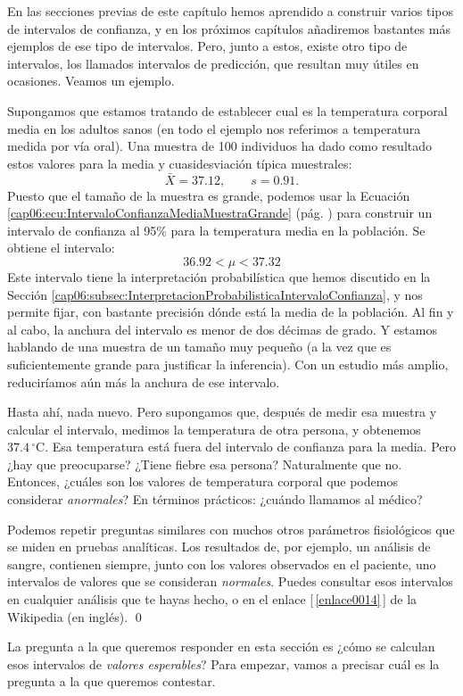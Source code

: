 En las secciones previas de este capítulo hemos aprendido a construir varios tipos de intervalos de confianza, y en los próximos capítulos añadiremos bastantes más ejemplos de ese tipo de intervalos. Pero, junto a estos, existe otro tipo de intervalos, los llamados intervalos de predicción, que resultan muy útiles en ocasiones. Veamos un ejemplo.
\begin{ejemplo}
Supongamos que estamos tratando de establecer cual es la temperatura corporal media en los adultos sanos (en todo el ejemplo nos referimos a temperatura medida por vía oral). Una muestra de 100 individuos ha dado como resultado estos valores para la media y cuasidesviación típica muestrales:
\[\bar X=37.12,\qquad s=0.91.\]
Puesto que el tamaño de la muestra es grande, podemos usar la Ecuación \ref{cap06:ecu:IntervaloConfianzaMediaMuestraGrande} (pág. \pageref{cap06:ecu:IntervaloConfianzaMediaMuestraGrande}) para construir un intervalo de confianza al 95\% para la temperatura media en la población. Se obtiene el intervalo:
\[ 36.92< \mu <  37.32\]
Este intervalo tiene la interpretación probabilística que hemos discutido en la Sección \ref{cap06:subsec:InterpretacionProbabilisticaIntervaloConfianza}, y nos permite fijar, con bastante precisión dónde está la media de la población. Al fin y al cabo, la anchura del intervalo es menor de dos décimas de grado. Y estamos hablando de una muestra de un tamaño muy pequeño (a la vez que es suficientemente grande para justificar la inferencia). Con un estudio más amplio, reduciríamos aún más la anchura de ese intervalo.

Hasta ahí, nada nuevo. Pero supongamos que, después de medir esa muestra y calcular el intervalo, medimos la temperatura de otra persona, y obtenemos $37.4\,^{\circ}\mathrm{C}$. Esa temperatura está fuera del intervalo de confianza para la media. Pero ¿hay que preocuparse? ¿Tiene fiebre esa persona? Naturalmente que no. Entonces, ¿cuáles son los valores de temperatura corporal que podemos considerar {\em anormales}? En términos prácticos: ¿cuándo llamamos al médico?

Podemos repetir preguntas similares con muchos otros parámetros fisiológicos que se miden en
pruebas analíticas. Los resultados de, por ejemplo, un análisis de sangre, contienen siempre, junto
con los valores observados en el paciente, uno intervalos de valores que se consideran {\em
normales}.  Puedes consultar esos intervalos en cualquier análisis que te hayas hecho, o en el enlace [\,\ref{enlace0014}\,]\label{enlace0014a} de la Wikipedia (en inglés).
\qed
\end{ejemplo}
La pregunta a la que queremos responder en esta sección es ¿cómo se calculan esos intervalos de
{\em valores esperables}? Para empezar, vamos a precisar cuál es la pregunta a la que queremos
contestar.

